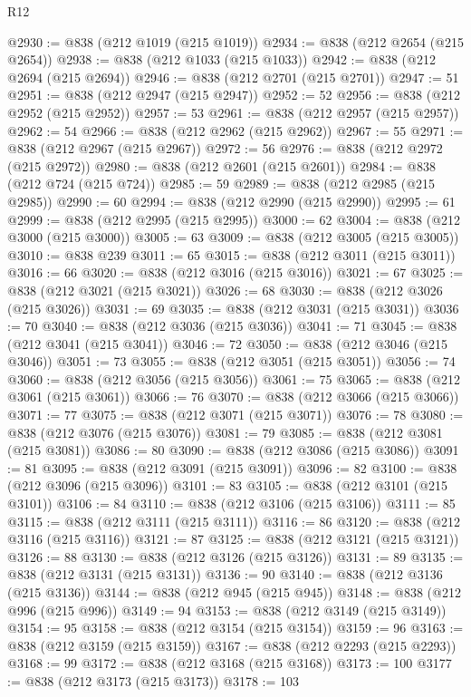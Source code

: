 \begin{lexlean}{R12}
\begin{coremodule}
@2930 := @838 (@212 @1019 (@215 @1019))
@2934 := @838 (@212 @2654 (@215 @2654))
@2938 := @838 (@212 @1033 (@215 @1033))
@2942 := @838 (@212 @2694 (@215 @2694))
@2946 := @838 (@212 @2701 (@215 @2701))
@2947 := 51
@2951 := @838 (@212 @2947 (@215 @2947))
@2952 := 52
@2956 := @838 (@212 @2952 (@215 @2952))
@2957 := 53
@2961 := @838 (@212 @2957 (@215 @2957))
@2962 := 54
@2966 := @838 (@212 @2962 (@215 @2962))
@2967 := 55
@2971 := @838 (@212 @2967 (@215 @2967))
@2972 := 56
@2976 := @838 (@212 @2972 (@215 @2972))
@2980 := @838 (@212 @2601 (@215 @2601))
@2984 := @838 (@212 @724 (@215 @724))
@2985 := 59
@2989 := @838 (@212 @2985 (@215 @2985))
@2990 := 60
@2994 := @838 (@212 @2990 (@215 @2990))
@2995 := 61
@2999 := @838 (@212 @2995 (@215 @2995))
@3000 := 62
@3004 := @838 (@212 @3000 (@215 @3000))
@3005 := 63
@3009 := @838 (@212 @3005 (@215 @3005))
@3010 := @838 @239
@3011 := 65
@3015 := @838 (@212 @3011 (@215 @3011))
@3016 := 66
@3020 := @838 (@212 @3016 (@215 @3016))
@3021 := 67
@3025 := @838 (@212 @3021 (@215 @3021))
@3026 := 68
@3030 := @838 (@212 @3026 (@215 @3026))
@3031 := 69
@3035 := @838 (@212 @3031 (@215 @3031))
@3036 := 70
@3040 := @838 (@212 @3036 (@215 @3036))
@3041 := 71
@3045 := @838 (@212 @3041 (@215 @3041))
@3046 := 72
@3050 := @838 (@212 @3046 (@215 @3046))
@3051 := 73
@3055 := @838 (@212 @3051 (@215 @3051))
@3056 := 74
@3060 := @838 (@212 @3056 (@215 @3056))
@3061 := 75
@3065 := @838 (@212 @3061 (@215 @3061))
@3066 := 76
@3070 := @838 (@212 @3066 (@215 @3066))
@3071 := 77
@3075 := @838 (@212 @3071 (@215 @3071))
@3076 := 78
@3080 := @838 (@212 @3076 (@215 @3076))
@3081 := 79
@3085 := @838 (@212 @3081 (@215 @3081))
@3086 := 80
@3090 := @838 (@212 @3086 (@215 @3086))
@3091 := 81
@3095 := @838 (@212 @3091 (@215 @3091))
@3096 := 82
@3100 := @838 (@212 @3096 (@215 @3096))
@3101 := 83
@3105 := @838 (@212 @3101 (@215 @3101))
@3106 := 84
@3110 := @838 (@212 @3106 (@215 @3106))
@3111 := 85
@3115 := @838 (@212 @3111 (@215 @3111))
@3116 := 86
@3120 := @838 (@212 @3116 (@215 @3116))
@3121 := 87
@3125 := @838 (@212 @3121 (@215 @3121))
@3126 := 88
@3130 := @838 (@212 @3126 (@215 @3126))
@3131 := 89
@3135 := @838 (@212 @3131 (@215 @3131))
@3136 := 90
@3140 := @838 (@212 @3136 (@215 @3136))
@3144 := @838 (@212 @945 (@215 @945))
@3148 := @838 (@212 @996 (@215 @996))
@3149 := 94
@3153 := @838 (@212 @3149 (@215 @3149))
@3154 := 95
@3158 := @838 (@212 @3154 (@215 @3154))
@3159 := 96
@3163 := @838 (@212 @3159 (@215 @3159))
@3167 := @838 (@212 @2293 (@215 @2293))
@3168 := 99
@3172 := @838 (@212 @3168 (@215 @3168))
@3173 := 100
@3177 := @838 (@212 @3173 (@215 @3173))
@3178 := 103

\end{coremodule}
\end{lexlean}
